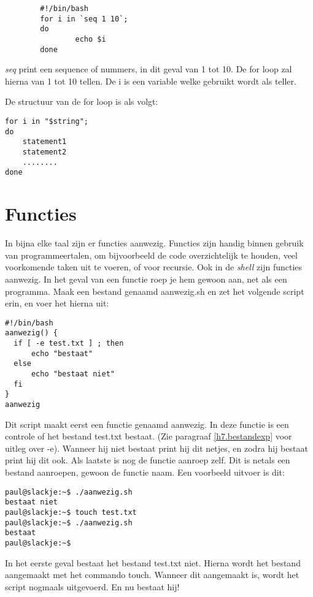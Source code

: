 \begin{lstlisting}
        #!/bin/bash
        for i in `seq 1 10`;
        do
                echo $i
        done    
\end{lstlisting}%
\emph{seq} print een sequence of nummers, in dit geval van 1 tot 10. De for loop zal hierna van 1 tot 10 tellen. De i is een variable welke gebruikt wordt als teller.

De structuur van de for loop is als volgt:
\begin{lstlisting}
for i in "$string";
do
    statement1
    statement2
    ........
done
\end{lstlisting}%

\section{Functies}
In bijna elke taal zijn er functies aanwezig. Functies zijn handig binnen gebruik van programmeertalen, om bijvoorbeeld de code overzichtelijk te houden, veel voorkomende taken uit te voeren, of voor recursie.
Ook in de \emph{shell} zijn functies aanwezig. In het geval van een functie roep je hem gewoon aan, net als een programma.
Maak een bestand genaamd aanwezig.sh en zet het volgende script erin, en voer het hierna uit:
\begin{lstlisting}
#!/bin/bash
aanwezig() {
  if [ -e test.txt ] ; then
      echo "bestaat"
  else
      echo "bestaat niet"
  fi
}
aanwezig 
\end{lstlisting}Dit script maakt eerst een functie genaamd aanwezig. In deze functie is een controle of het bestand test.txt bestaat. (Zie paragraaf \ref{h7.bestandexp} voor uitleg over -e). Wanneer hij niet bestaat print hij dit netjes, en zodra hij bestaat print hij dit ook. Als laatste is nog de functie aanroep zelf. Dit is netals een bestand aanroepen, gewoon de functie naam.
Een voorbeeld uitvoer is dit:
\begin{lstlisting}
paul@slackje:~$ ./aanwezig.sh 
bestaat niet
paul@slackje:~$ touch test.txt
paul@slackje:~$ ./aanwezig.sh 
bestaat
paul@slackje:~$ 
\end{lstlisting}
In het eerste geval bestaat het bestand test.txt niet. Hierna wordt het bestand aangemaakt met het commando touch. Wanneer dit aangemaakt is, wordt het script nogmaals uitgevoerd. En nu bestaat hij!

